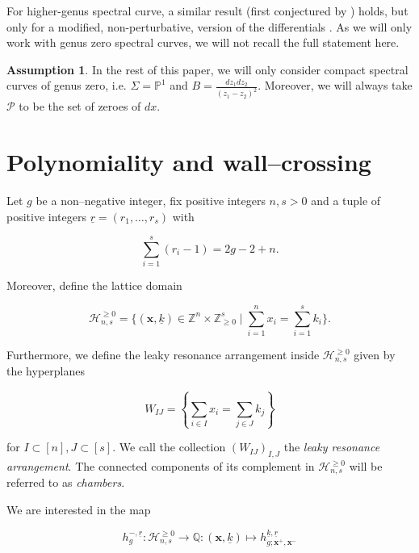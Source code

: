 \documentclass[10pt,a4paper,oneside,no-math,reqno]{amsart}%
\theoremstyle{plain}
\theoremstyle{definition}
\newtheorem{assumption}[theorem]{Assumption}
\theoremstyle{remark}
\numberwithin{equation}{section}
\newcommand{\mb}[1]{\mathbb{#1}}
\newcommand{\mc}[1]{\mathcal{#1}}
\newcommand{\1}{\mathds{1}}
\renewcommand{\P}{\mb{P}}
\newcommand{\<}{\langle}
\renewcommand{\>}{\rangle}
\begin{document}
For higher-genus spectral curve, a similar result (first conjectured by \cite{BE12}) holds, but only for a modified, non-perturbative, version of the differentials \cite{ABDKS24KP+}. As we will only work with genus zero spectral curves, we will not recall the full statement here.

\begin{assumption}
    In the rest of this paper, we will only consider compact spectral curves of genus zero, i.e. $ \Sigma = \P^1$ and $ B = \frac{dz_1 dz_2}{(z_1 - z_2)^2}$. Moreover, we will always take $ \mc{P}$ to be the set of zeroes of $ dx$.
\end{assumption}

\section{Polynomiality and wall--crossing}
\label{PolyWC}

Let $g$ be a non--negative integer, fix positive integers $n,s>0$ and a tuple of positive integers $\underline{r}=(r_1,\dots,r_s)$ with

\begin{equation}
    \sum_{i=1}^s (r_i - 1)
    =
    2g-2+n.
\end{equation}

Moreover, define the lattice domain

\begin{equation}
    \mathcal{H}_{n,s}^{\ge0}=\{(\mathbf{x},\underline{k})\in\mathbb{Z}^n\times\mathbb{Z}_{\ge0}^s\mid \sum_{i=1}^nx_i=\sum_{i=1}^sk_i\}.
\end{equation}

Furthermore, we define the leaky resonance arrangement inside $\mathcal{H}_{n,s}^{\ge0}$ given by the hyperplanes

\begin{equation}
    W_{IJ}=\left\{\sum_{i\in I}x_i=\sum_{j\in J}k_j\right\}
\end{equation}

for $I\subset[n],J\subset[s]$. We call the collection $(W_{IJ})_{I,J}$ the \emph{leaky resonance arrangement}. The connected components of its complement in $\mathcal{H}_{n,s}^{\ge0}$ will be referred to as \emph{chambers}.


We are interested in the map

\begin{equation}
    h_g^{-,\underline{r}}
    \colon
    \mathcal{H}_{n,s}^{\ge0}\to\mathbb{Q}
    \colon
    (\mathbf{x},\underline{k})\mapsto h^{\underline{k},\underline{r}}_{g;\mathbf{x}^+,\mathbf{x}^-}
\end{equation}
\end{document}
